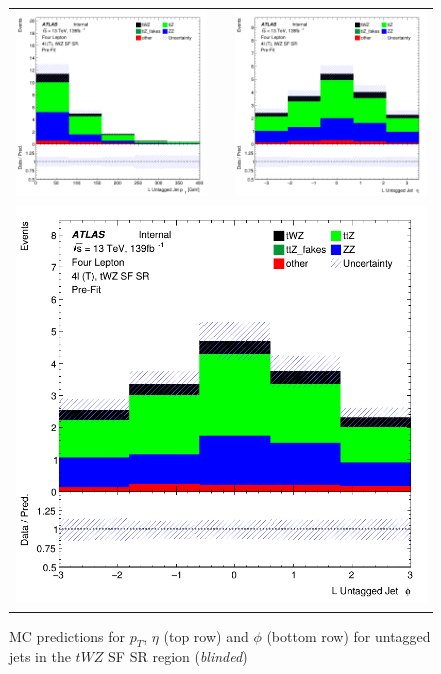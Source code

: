 \begin{figure}[htbp]
\centering
  \begin{tabular}{ccc}

    \includegraphics[width=.2\textwidth]{figures/PreFitPlots/lep4_tWZ_4T_SF_L_UntaggedJet_pt} & &
    \includegraphics[width=.2\textwidth]{figures/PreFitPlots/lep4_tWZ_4T_SF_L_UntaggedJet_eta} \\
    \multicolumn{3}{c}{\includegraphics[width=.2\textwidth]{figures/PreFitPlots/lep4_tWZ_4T_SF_L_UntaggedJet_phi}}
  \end{tabular}
      \caption{MC predictions for $p_{T}$, $\eta$ (top row) and $\phi$ (bottom row) for untagged jets in the $tWZ$ SF SR region (\textit{blinded})}
  \label{fig:4lep-SF-SR-UntaggedjetPlots}
\end{figure}

